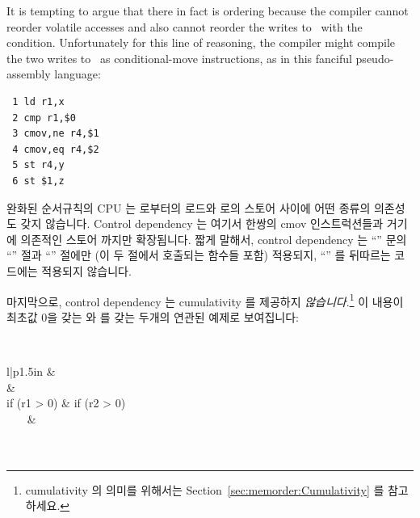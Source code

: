 It is tempting to argue that there in fact is ordering because the
compiler cannot reorder volatile accesses and also cannot reorder
the writes to~ with the condition.
Unfortunately for this line
of reasoning, the compiler might compile the two writes to~ as
conditional-move instructions, as in this fanciful pseudo-assembly
language:
\fi

\vspace{5pt}
\begin{minipage}[t]{\columnwidth}
\scriptsize
\begin{verbatim}
 1 ld r1,x
 2 cmp r1,$0
 3 cmov,ne r4,$1
 4 cmov,eq r4,$2
 5 st r4,y
 6 st $1,z
\end{verbatim}
\end{minipage}
\vspace{5pt}

완화된 순서규칙의 CPU 는  로부터의 로드와  로의 스토어 사이에 어떤
종류의 의존성도 갖지 않습니다.
Control dependency 는 여기서 한쌍의 cmov 인스트럭션들과 거기에 의존적인 스토어
까지만 확장됩니다.
짧게 말해서, control dependency 는 ``'' 문의 ``'' 절과
``'' 절에만 (이 두 절에서 호출되는 함수들 포함) 적용되지, ``''
를 뒤따르는 코드에는 적용되지 않습니다.

마지막으로, control dependency 는 cumulativity 를 제공하지 \emph{않습니다}.\footnote{
	cumulativity 의 의미를 위해서는 Section~\ref{sec:memorder:Cumulativity}
	를 참고하세요.}
이 내용이 최초값 0을 갖는  와  를 갖는 두개의 연관된 예제로
보여집니다:

\vspace{5pt}
\begin{minipage}[t]{\columnwidth}
\tt
\scriptsize
\begin{tabular}{l|p{1.5in}}
	 &	\nf{CPU 1} \\
	\hline
	 &
		\tco{r2 = READ_ONCE(y);} \\
	if (r1 > 0) &
		if (r2 > 0) \\
	~~~ &
		~~~\tco{WRITE_ONCE(x, 1);} \\
	 \\
	 \\
\end{tabular}
\end{minipage}
\vspace{5pt}

